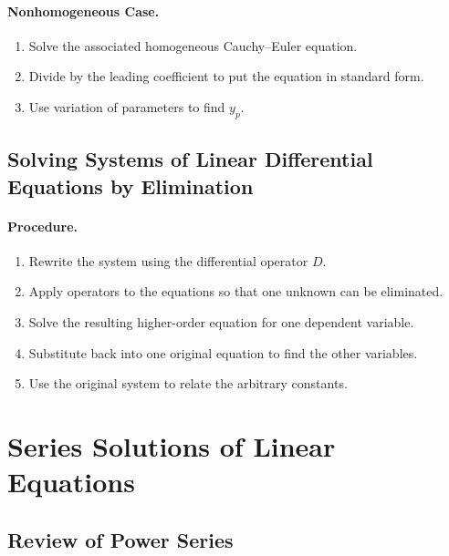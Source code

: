 \documentclass[oneside]{book}
\begin{document}
\paragraph{Nonhomogeneous Case.}
\begin{enumerate}
    \item Solve the associated homogeneous Cauchy--Euler equation.
    \item Divide by the leading coefficient to put the equation in standard form.
    \item Use variation of parameters to find $y_p$.
\end{enumerate}

\subsection{Solving Systems of Linear Differential Equations by Elimination}


\paragraph{Procedure.}
\begin{enumerate}
    \item Rewrite the system using the differential operator $D$.
    \item Apply operators to the equations so that one unknown can be eliminated.
    \item Solve the resulting higher-order equation for one dependent variable.
    \item Substitute back into one original equation to find the other variables.
    \item Use the original system to relate the arbitrary constants.
\end{enumerate}

\section{Series Solutions of Linear Equations}

\subsection{Review of Power Series}
\end{document}
